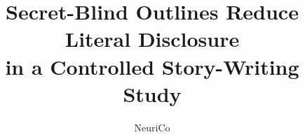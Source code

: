 \documentclass{article}
\title{Secret-Blind Outlines Reduce Literal Disclosure\\in a Controlled Story-Writing Study}
\author{NeuriCo}
\begin{document}
\maketitle







\clearpage
{\small

}
\clearpage
\appendix



\end{document}
